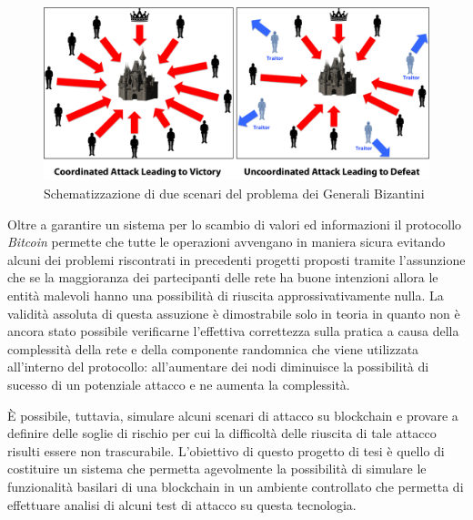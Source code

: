 \begin{figure}
    \centering
    \includegraphics[scale=0.25]{images/byzantine.png}
    \caption{Schematizzazione di due scenari del problema dei Generali Bizantini}
\end{figure}

Oltre a garantire un sistema per lo scambio di valori ed informazioni il protocollo \textit{Bitcoin} permette che tutte le operazioni avvengano in maniera sicura evitando alcuni dei problemi riscontrati in precedenti progetti proposti tramite l'assunzione che se la maggioranza dei partecipanti delle rete ha buone intenzioni allora le entità malevoli hanno una possibilità di riuscita approssivativamente nulla.\newline
La validità assoluta di questa assuzione è dimostrabile solo in teoria in quanto non è ancora stato possibile verificarne l'effettiva correttezza sulla pratica a causa della complessità della rete e della componente randomnica che viene utilizzata all'interno del protocollo: all'aumentare dei nodi diminuisce la possibilità di sucesso di un potenziale attacco e ne aumenta la complessità.\newline\newline

È possibile, tuttavia, simulare alcuni scenari di attacco su blockchain e provare a definire delle soglie di rischio per cui la difficoltà delle riuscita di tale attacco risulti essere non trascurabile.\newline
L'obiettivo di questo progetto di tesi è quello di costituire un sistema che permetta agevolmente la possibilità di simulare le funzionalità basilari di una blockchain in un ambiente controllato che permetta di effettuare analisi di alcuni test di attacco su questa tecnologia.



